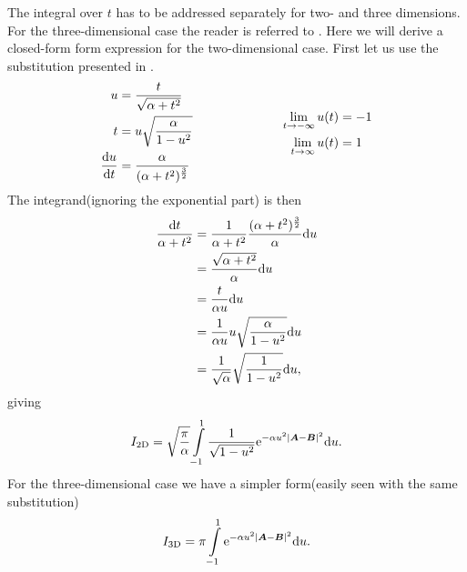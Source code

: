     The integral over $t$ has to be addressed separately for two- and three
    dimensions. For the three-dimensional case the reader is referred to
    \cite{HelgakerTaylorGauss}. Here we will derive a closed-form form
    expression for the two-dimensional case. First let us use the substitution
    presented in .
        \begin{equation}
            \begin{aligned}
                u &= \frac{t}{\sqrt{\alpha+t^2}} \\
                t &= u\sqrt{\frac{\alpha}{1-u^2}} \\
                \frac{\mathrm{d} u}{\mathrm{d} t} &= \frac{\alpha}{(\alpha +
                t^2)^{\frac{3}{2}}}
            \end{aligned}
            \hspace{2.5cm}
            \begin{aligned}
                \lim\limits_{t\rightarrow -\infty} u(t) &= -1 \\ 
                \lim\limits_{t\rightarrow \infty} u(t) &= 1
            \end{aligned}
            \label{eq:uSubs1}
        \end{equation}
    The integrand(ignoring the exponential part) is then
        \begin{align}
            \frac{\mathrm{d} t}{\alpha + t^2} &= \frac{1}{\alpha + t^2} \frac{(\alpha +
            t^2)^{\frac{3}{2}}}{\alpha} \mathrm{d} u \nonumber \\
            &= \frac{\sqrt{\alpha + t^2}}{\alpha} \mathrm{d} u \nonumber \\
            &= \frac{t}{\alpha u} \mathrm{d} u \nonumber \\
            &= \frac{1}{\alpha u} u\sqrt{\frac{\alpha}{1-u^2}} \mathrm{d} u \nonumber \\
            &= \frac{1}{\sqrt{\alpha}}\sqrt{\frac{1}{1-u^2}} \mathrm{d} u,
        \end{align}
    giving
        \begin{align}
            I_{\text{2D}} = \sqrt{\frac{\pi}{\alpha}}\int\limits^1_{-1}
            \frac{1}{\sqrt{1-u^2}} \mathrm{e}^{-\alpha u^2\abs{\boldsymbol{{A}} - \boldsymbol{{B}}}^2}
            \mathrm{d} u.
            \label{eq:oneElectron2D}
        \end{align}
    For the three-dimensional case we have a simpler form(easily seen with the
    same substitution)
        \begin{align}
            I_{\text{3D}} = \pi\int\limits^1_{-1} \mathrm{e}^{-\alpha u^2\abs{\boldsymbol{{A}}
            - \boldsymbol{{B}}}^2} \mathrm{d} u.
            \label{eq:oneElectron3D}
        \end{align}
